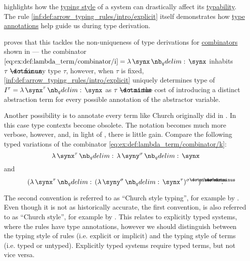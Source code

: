 \begin{remark}\label{rem:typing_style}
   highlights how the \hyperref[def:simple_type_system_style]{typing style} of a system can drastically affect its \hyperref[def:typability]{typability}. The rule \ref{inf:def:arrow_typing_rules/intro/explicit} itself demonstrates how \hyperref[con:type_annotation]{type annotations} help guide us during type derivation.

   proves that this tackles the non-uniqueness of type derivations for \hyperref[def:lambda_combinator]{combinators} shown in  --- the combinator \( \ref{eq:ex:def:lambda_term/combinator/i} = \qabs \synx \synx \) inhabits \( \tau \synimplies \tau \) for any type \( \tau \), however, when \( \tau \) is fixed, \ref{inf:def:arrow_typing_rules/intro/explicit} uniquely determines  type of \( I^\tau = \qabs {\synx^\tau} \synx \) as \( \tau \synimplies \tau \) at the cost of introducing a distinct abstraction term for every possible annotation of the abstractor variable.

  Another possibility is to annotate every term like Church originally did in \cite{Church1940STT}. In this case type contexts become obsolete. The notation becomes much more verbose, however, and, in light of , there is little gain. Compare the following typed variations of the combinator \ref{eq:ex:def:lambda_term/combinator/k}:
  \begin{equation*}
    \qabs {\synx^\tau} \qabs {\syny^\sigma} \synx
  \end{equation*}
  and
  \begin{equation*}
    (\qabs {\synx^\tau} (\qabs {\syny^\sigma} \synx^\tau)^{\sigma \synimplies \tau})^{\tau \synimplies \sigma \synimplies \tau}.
  \end{equation*}

  The second convention is referred to as \enquote{Church style typing}, for example by \cite[ch. 5]{Hindley1997BasicSTT}. Even though it is not as historically accurate, the first convention, is also referred to as \enquote{Church style}, for example by . This relates to explicitly typed systems, where the rules have type annotations, however we should distinguish between the typing style of rules (i.e. explicit or implicit) and the typing style of terms (i.e. typed or untyped). Explicitly typed systems require typed terms, but not vice versa.


\end{remark}
